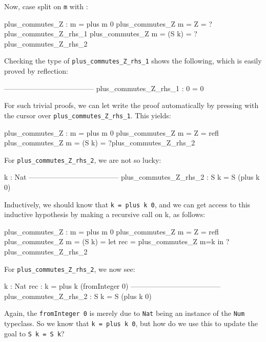 \noindent
Now, case split on \texttt{m} with \csplit{}:

\begin{code}
plus_commutes_Z : m = plus m 0
plus_commutes_Z {m = Z} = ?plus_commutes_Z_rhs_1
plus_commutes_Z {m = (S k)} = ?plus_commutes_Z_rhs_2
\end{code}

\noindent
Checking the type of \texttt{plus\_commutes\_Z\_rhs\_1} shows the following,
which is easily proved by reflection:

\begin{code}
--------------------------------------
plus_commutes_Z_rhs_1 : 0 = 0
\end{code}

\noindent
For such trivial proofs, we can let \Idris{} write the proof automatically
by pressing \psearch{} with the cursor over \texttt{plus\_commutes\_Z\_rhs\_1}.
This yields:

\begin{code}
plus_commutes_Z : m = plus m 0
plus_commutes_Z {m = Z} = refl
plus_commutes_Z {m = (S k)} = ?plus_commutes_Z_rhs_2
\end{code}

\noindent
For \texttt{plus\_commutes\_Z\_rhs\_2}, we are not so lucky:

\begin{code}
  k : Nat
--------------------------------------
plus_commutes_Z_rhs_2 : S k = S (plus k 0)
\end{code}

\noindent
Inductively, we should know that \texttt{k = plus k 0}, and we can get access
to this inductive hypothesis by making a recursive call on k, as follows:

\begin{code}
plus_commutes_Z : m = plus m 0
plus_commutes_Z {m = Z} = refl
plus_commutes_Z {m = (S k)} = let rec = plus_commutes_Z {m=k} in
                                  ?plus_commutes_Z_rhs_2
\end{code}

\noindent
For \texttt{plus\_commutes\_Z\_rhs\_2}, we now see:

\begin{code}
  k : Nat
  rec : k = plus k (fromInteger 0)
--------------------------------------
plus_commutes_Z_rhs_2 : S k = S (plus k 0)
\end{code}

\noindent
Again, the \texttt{fromInteger 0} is merely due to \texttt{Nat} being an
instance of the \texttt{Num} typeclass. So we know that \texttt{k = plus k 0},
but how do we use this to update the goal to \texttt{S k = S k}?

